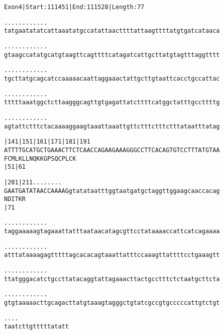 \documentclass{article}
\begin{document}
\begin{alltt}
Exon 4 | Start: 111451 | End: 111528 | Length: 77

.    .    .    .    .    .    .    .    .    .    .    .    
tatgaatatatcattaaatatgccatattaacttttattaagttttatgtgatcataaca

.    .    .    .    .    .    .    .    .    .    .    .    
gtaagccatatgcatgtaagttcagttttcatagatcattgcttatgtagtttaggtttt

.    .    .    .    .    .    .    .    .    .    .    .    
tgcttatgcagcatccaaaaacaattaggaaactattgcttgtaattcacctgccattac

.    .    .    .    .    .    .    .    .    .    .    .    
tttttaaatggctcttaagggcagttgtgagattatcttttcatggctatttgccttttg

.    .    .    .    .    .    .    .    .    .    .    .    
agtattctttctacaaaaggaagtaaattaaattgttctttctttctttataatttatag

      |141      |151      |161      |171      |181      |191
ATTTTGCATGCTGAAACTTCTCAACCAGAAGAAAGGGCCTTCACAGTGTCCTTTATGTAA
 F  C  M  L  K  L  L  N  Q  K  K  G  P  S  Q  C  P  L  C  K 
                |51                           |61           

      |201      |211  .    .    .    .    .    .    .    .  
GAATGATATAACCAAAAGgtatataatttggtaatgatgctaggttggaagcaaccacag
 N  D  I  T  K  R                                           
                |71                                         

  .    .    .    .    .    .    .    .    .    .    .    .  
taggaaaaagtagaaattatttaataacatagcgttcctataaaaccattcatcagaaaa

  .    .    .    .    .    .    .    .    .    .    .    .  
atttataaaagagtttttagcacacagtaaattatttccaaagttattttcctgaaagtt

  .    .    .    .    .    .    .    .    .    .    .    .  
ttatgggacatctgccttatacaggtattagaaacttactgcctttctctaatgcttcta

  .    .    .    .    .    .    .    .    .    .    .    .  
gtgtaaaaacttgcagacttatgtaaagtagggctgtatcgccgtgcccccattgtctgt

  .    .    .    .
taatcttgtttttatatt
\end{alltt}
\newpage
\end{document}
